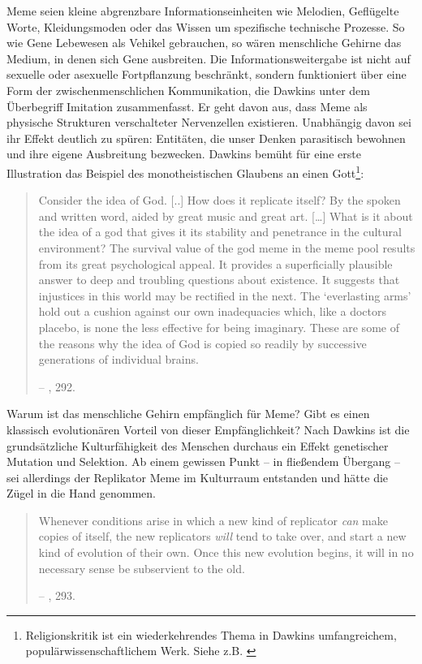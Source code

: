 \documentclass[openany,twoside,twocolumn]{book}
\let\rmarkdownfootnote\footnote%
\def\footnote{\protect\rmarkdownfootnote}
\begin{document}
Meme seien kleine abgrenzbare Informationseinheiten wie Melodien, Geflügelte Worte, Kleidungsmoden oder das Wissen um spezifische technische Prozesse. So wie Gene Lebewesen als Vehikel gebrauchen, so wären menschliche Gehirne das Medium, in denen sich Gene ausbreiten. Die Informationsweitergabe ist nicht auf sexuelle oder asexuelle Fortpflanzung beschränkt, sondern funktioniert über eine Form der zwischenmenschlichen Kommunikation, die Dawkins unter dem Überbegriff Imitation zusammenfasst. Er geht davon aus, dass Meme als physische Strukturen verschalteter Nervenzellen existieren. Unabhängig davon sei ihr Effekt deutlich zu spüren: Entitäten, die unser Denken parasitisch bewohnen und ihre eigene Ausbreitung bezwecken. Dawkins bemüht für eine erste Illustration das Beispiel des monotheistischen Glaubens an einen Gott\footnote{Religionskritik ist ein wiederkehrendes Thema in Dawkins umfangreichem, populärwissenschaftlichem Werk. Siehe z.B. \textcite{dawkins_god_2006}}:

\begin{quote}
Consider the idea of God. {[}..{]} How does it replicate itself? By the spoken and written word, aided by great music and great art. {[}\ldots{}{]} What is it about the idea of a god that gives it its stability and penetrance in the cultural environment? The survival value of the god meme in the meme pool results from its great psychological appeal. It provides a superficially plausible answer to deep and troubling questions about existence. It suggests that injustices in this world may be rectified in the next. The `everlasting arms' hold out a cushion against our own inadequacies which, like a doctors placebo, is none the less effective for being imaginary. These are some of the reasons why the idea of God is copied so readily by successive generations of individual brains.

-- \textcite{Dawkinsselfishgene40th2016}, 292.
\end{quote}

Warum ist das menschliche Gehirn empfänglich für Meme? Gibt es einen klassisch evolutionären Vorteil von dieser Empfänglichkeit? Nach Dawkins ist die grundsätzliche Kulturfähigkeit des Menschen durchaus ein Effekt genetischer Mutation und Selektion. Ab einem gewissen Punkt -- in fließendem Übergang -- sei allerdings der Replikator Meme im Kulturraum entstanden und hätte die Zügel in die Hand genommen.

\begin{quote}
Whenever conditions arise in which a new kind of replicator \emph{can} make copies of itself, the new replicators \emph{will} tend to take over, and start a new kind of evolution of their own. Once this new evolution begins, it will in no necessary sense be subservient to the old.

-- \textcite{Dawkinsselfishgene40th2016}, 293.
\end{quote}
\end{document}
